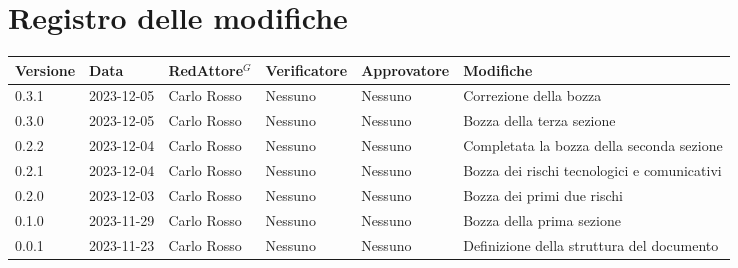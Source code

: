 \section*{Registro delle modifiche}

\begin{table}[H]
	\centering
	\fontsize{10}{12}\selectfont
	\begin{tabularx}{\textwidth}{l|l|l|l|l|X}
		\textbf{Versione} & \textbf{Data} & \textbf{Red\gls{Attore}$^G$} & \textbf{Verificatore} & \textbf{Approvatore} & \textbf{Modifiche}                          \\
		\toprule
		0.3.1             & 2023-12-05    & Carlo Rosso        & Nessuno               & Nessuno              & Correzione della bozza                      \\
		0.3.0             & 2023-12-05    & Carlo Rosso        & Nessuno               & Nessuno              & Bozza della terza sezione                   \\
		0.2.2             & 2023-12-04    & Carlo Rosso        & Nessuno               & Nessuno              & Completata la bozza della seconda sezione   \\
		0.2.1             & 2023-12-04    & Carlo Rosso        & Nessuno               & Nessuno              & Bozza dei rischi tecnologici e comunicativi \\
		0.2.0             & 2023-12-03    & Carlo Rosso        & Nessuno               & Nessuno              & Bozza dei primi due rischi                  \\
		0.1.0             & 2023-11-29    & Carlo Rosso        & Nessuno               & Nessuno              & Bozza della prima sezione                   \\
		0.0.1             & 2023-11-23    & Carlo Rosso        & Nessuno               & Nessuno              & Definizione della struttura del documento   \\
		\bottomrule
	\end{tabularx}
\end{table}
